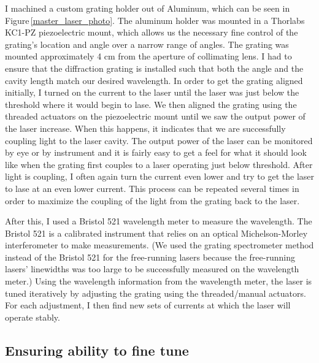  I machined a custom grating holder out of Aluminum, which can be seen in Figure\,\ref{master_laser_photo}. The aluminum holder was mounted in a Thorlabs KC1-PZ piezoelectric mount, which allows us the necessary fine control of the grating's location and angle over a narrow range of angles.  The grating was mounted approximately 4 cm from the aperture of collimating lens.
I had to ensure that the diffraction grating is installed such that both the angle and the cavity length match our desired wavelength. In order to get the grating aligned initially, I turned on the current to the laser until the laser was just below the threshold where it would begin to lase. We then aligned the grating using the threaded actuators on the piezoelectric mount until we saw the output power of the laser increase. When this happens, it indicates that we are successfully coupling light to the laser cavity. The output power of the laser can be monitored by eye or by instrument and it is fairly easy to get a feel for what it should look like when the grating first couples to a laser operating just below threshold. After light is coupling, I often again turn the current even lower and try to get the laser to lase at an even lower current. This process can be repeated several times in order to maximize the coupling of the light from the grating back to the laser.

After this, I used a Bristol 521 wavelength meter to measure the wavelength. The Bristol 521 is a calibrated instrument that relies on an optical Michelson-Morley interferometer to make measurements. (We used the grating spectrometer method instead of the Bristol 521 for the free-running lasers because the free-running lasers' linewidths was too large to be successfully measured on the wavelength meter.) Using the wavelength information from the wavelength meter, the laser is tuned iteratively by adjusting the grating using the threaded/manual actuators. For each adjustment, I then find new sets of currents at which the laser will operate stably. 

\subsection{Ensuring ability to fine tune}
\label{ensuringAbilityToFineTune}

